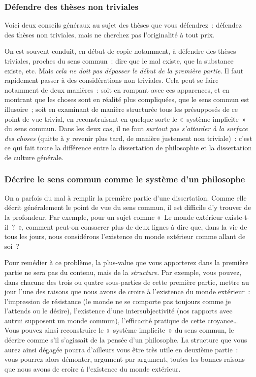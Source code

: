 \documentclass[a4paper]{article}
\begin{document}
\subsubsection{Défendre des thèses non triviales}
\label{sec-3-2-2}

Voici deux conseils généraux au sujet des thèses que vous défendrez :
défendez des thèses non triviales, mais ne cherchez pas l'originalité à
tout prix.

On est souvent conduit, en début de copie notamment, à défendre des
thèses triviales, proches du sens commun : dire que le mal existe, que
la substance existe, etc. Mais \emph{cela ne doit pas dépasser le début de la
première partie}. Il faut rapidement passer à des considérations non
triviales. Cela peut se faire notamment de deux manières : soit en
rompant avec ces apparences, et en montrant que les choses sont en
réalité plus compliquées, que le sens commun est illusoire ; soit en
examinant de manière structurée tous les présupposés de ce point de vue
trivial, en reconstruisant en quelque sorte le « système implicite » du
sens commun. Dans les deux cas, il ne faut \emph{surtout pas s'attarder à la
surface des choses} (quitte à y revenir plus tard, de manière justement
non triviale) : c'est ce qui fait toute la différence entre la
dissertation de philosophie et la dissertation de culture générale.

\subsubsection{Décrire le sens commun comme le système d'un philosophe}
\label{sec-3-2-3}

On a parfois du mal à remplir la première partie d'une dissertation.
Comme elle décrit généralement le point de vue du sens commun, il est
difficile d'y trouver de la profondeur. Par exemple, pour un sujet comme
« Le monde extérieur existe-t-il ? », comment peut-on consacrer plus de
deux lignes à dire que, dans la vie de tous les jours, nous considérons
l'existence du monde extérieur comme allant de soi ?

Pour remédier à ce problème, la plus-value que vous apporterez dans la
première partie ne sera pas du contenu, mais de la \emph{structure}. Par
exemple, vous pouvez, dans chacune des trois ou quatre sous-parties de
cette première partie, mettre au jour l'une des raisons que nous avons
de croire à l'existence du monde extérieur : l'impression de résistance
(le monde ne se comporte pas toujours comme je l'attends ou le désire),
l'existence d'une intersubjectivité (nos rapports avec autrui supposent
un monde commun), l'efficacité pratique de cette croyance\ldots{} Vous pouvez
ainsi reconstruire le « système implicite » du sens commun, le décrire
comme s'il s'agissait de la pensée d'un philosophe. La structure que
vous aurez ainsi dégagée pourra d'ailleurs vous être très utile en
deuxième partie : vous pourrez alors démonter, argument par argument,
toutes les bonnes raisons que nous avons de croire à l'existence du
monde extérieur.
\end{document}
